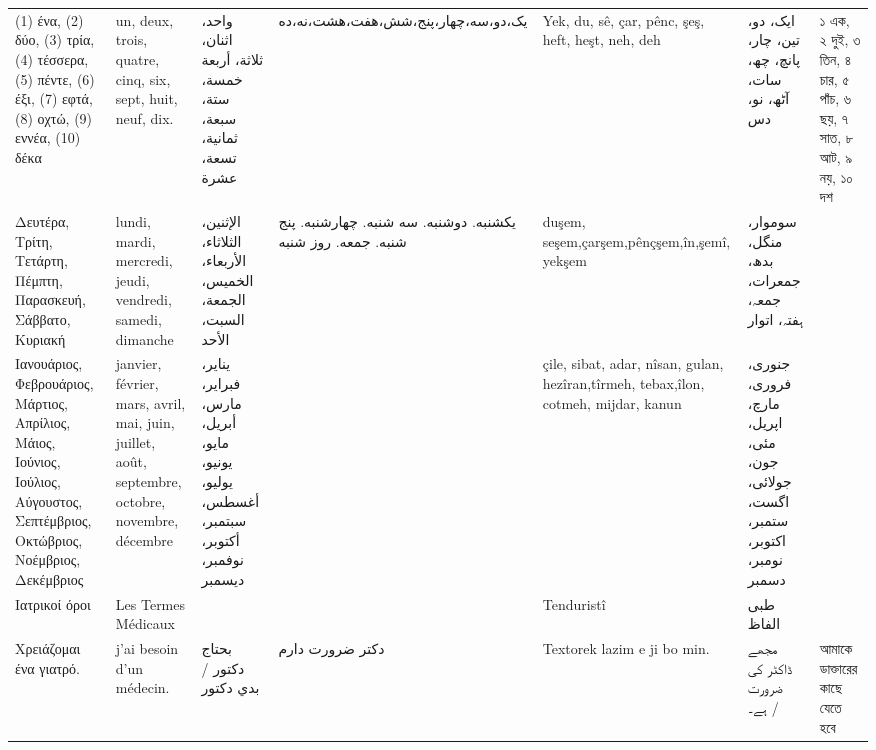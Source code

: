 \begin{longtable}{p{3.5cm} p{3.5cm} p{3.5cm} p{3.5cm} p{3.5cm} p{3.5cm} p{3.5cm} }
 (1) ένα, (2) δύο, (3) τρία, (4) τέσσερα, (5) πέντε, (6) έξι, (7) εφτά, (8) οχτώ, (9) εννέα, (10) δέκα                         & un, deux, trois, quatre, cinq, six, sept, huit, neuf, dix.                                      & واحد، اثنان، ثلاثة، أربعة خمسة، ستة، سبعة، ثمانية، تسعة، عشرة                         & یک،دو،سه،چهار،پنج،شش،هفت،هشت،نه،ده                          & Yek, du, sê, çar, pênc, şeş, heft, heşt, neh, deh                                  & ایک، دو، تین، چار، پانچ، چھ، سات، آٹھ، نو، دس                                  & ১ এক, ২ দুই, ৩ তিন, ৪ চার, ৫ পাঁচ, ৬ ছয়, ৭ সাত, ৮ আট, ৯ নয়, ১০ দশ \\
 Δευτέρα, Τρίτη, Τετάρτη, Πέμπτη, Παρασκευή, Σάββατο, Κυριακή                                                                  & lundi, mardi, mercredi, jeudi, vendredi, samedi, dimanche                                       & الإثنين، الثلاثاء، الأربعاء، الخميس، الجمعة، السبت، الأحد                             & یکشنبه. دوشنبه. سه شنبه. چهارشنبه. پنج شنبه. جمعه. روز شنبه & duşem, seşem,çarşem,pênçşem,în,şemî, yekşem                                        & سوموار، منگل، بدھ، جمعرات، جمعہ، ہفتہ، اتوار                                   &                                                                   \\
 Ιανουάριος, Φεβρουάριος, Μάρτιος, Απρίλιος, Μάιος, Ιούνιος, Ιούλιος, Αύγουστος, Σεπτέμβριος, Οκτώβριος, Νοέμβριος, Δεκέμβριος & janvier, février, mars, avril, mai, juin, juillet, août, septembre, octobre, novembre, décembre & يناير، فبراير، مارس، أبريل، مايو، يونيو، يوليو، أغسطس، سبتمبر، أكتوبر، نوفمبر، ديسمبر &                                                             & çile, sibat, adar, nîsan, gulan, hezîran,tîrmeh, tebax,îlon, cotmeh, mijdar, kanun & جنوری، فروری، مارچ، اپریل، مئی، جون، جولائی، اگست، ستمبر، اکتوبر، نومبر، دسمبر &                                                                   \\
\midrule
 Ιατρικοί όροι                          & Les Termes Médicaux                                 &                                      &                                          & Tenduristî                                  & طبی الفاظ                         &                                         \\
\midrule
 Χρειάζομαι ένα γιατρό.                 & j'ai besoin d'un médecin.                           & بحتاج دکتور  /  بدي دكتور            & دکتر ضرورت دارم                          & Textorek lazim e ji bo min.                 & مجھے ڈاکٹر کی ضرورت ہے۔ /         & আমাকে ডাক্তারের কাছে যেতে হবে           \\

\end{longtable}
